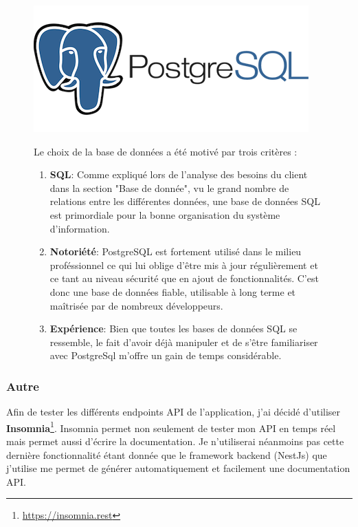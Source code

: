 \begin{figure}[H]
  \begin{minipage}{.3\textwidth}
    \includegraphics[width=0.75\linewidth]{img/tech/PostgreSql.png} 
  \end{minipage} 
  \begin{minipage}{.7\textwidth}
    Le choix de la base de données a été motivé par trois critères :
    \begin{enumerate}
      \item \textbf{SQL}: Comme expliqué lors de l'analyse des besoins du client dans la section "Base de donnée", vu le grand nombre de relations entre les différentes données, une base de données SQL est primordiale pour la bonne organisation du système d'information.
      \item \textbf{Notoriété}: PostgreSQL est fortement utilisé dans le milieu proféssionnel ce qui lui oblige d'être mis à jour régulièrement et ce tant au niveau sécurité que en ajout de fonctionnalités. C'est donc une base de données fiable, utilisable à long terme et maîtrisée par de nombreux développeurs.
      \item \textbf{Expérience}: Bien que toutes les bases de données SQL se ressemble, le fait d'avoir déjà manipuler et de s'être familiariser avec PostgreSql m'offre un gain de temps considérable.
    \end{enumerate}
  \end{minipage} 
\end{figure}

\newpage

\subsubsection{Autre}


Afin de tester les différents endpoints API de l'application, j'ai décidé d'utiliser \textbf{Insomnia}\footnote{\url{https://insomnia.rest}}. Insomnia permet non seulement de tester mon API en temps réel mais permet aussi d'écrire la documentation. Je n'utiliserai néanmoins pas cette dernière fonctionnalité étant donnée que le framework backend (NestJs) que j'utilise me permet de générer automatiquement et facilement une documentation API.

